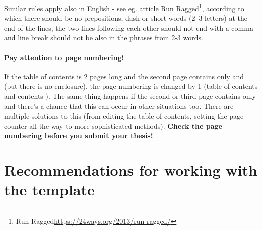 Similar rules apply also in English - see eg. article Run Ragged\footnote{Run Ragged\url{https://24ways.org/2013/run-ragged/}}, according to which there should be no prepositions, dash or short words (2--3 letters) at the end of the lines, the two lines following each other should not end with a comma and line break should not be also in the phrases from 2-3 words.

\paragraph {Pay attention to page numbering!} If the table of contents is 2 pages long and the second page contains only  and  (but there is no enclosure), the page numbering is changed by 1 (table of contents and contents ). The same thing happens if the second or third page contains only  and there's a chance that this can occur in other situations too. There are multiple solutions to this (from editing the table of contents, setting the page counter all the way to more sophisticated methods). \textbf{Check the page numbering before you submit your thesis!}

\section*{Recommendations for working with the template}

